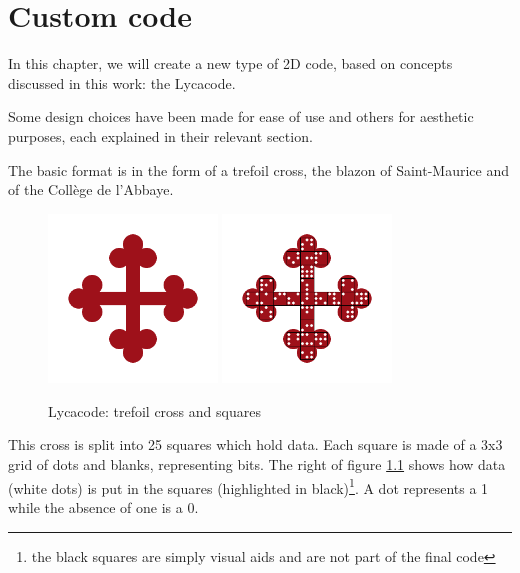 \chapter{Custom code}
\label{chap:custom_code}

In this chapter, we will create a new type of 2D code, based on concepts discussed in this work: the Lycacode.

Some design choices have been made for ease of use and others for aesthetic purposes, each explained in their relevant section.

The basic format is in the form of a trefoil cross, the blazon of Saint-Maurice and of the Collège de l'Abbaye.

\begin{figure}[H]
  \centering
  \includegraphics[width=0.4\textwidth]{images/lycacode_cross}
  \includegraphics[width=0.4\textwidth]{images/lycacode_squares}
  \caption{Lycacode: trefoil cross and squares}
  \label{fig:lycacode_cross}
\end{figure}


This cross is split into 25 squares which hold data. Each square is made of a 3x3 grid of dots and blanks, representing bits. The right of figure \ref{fig:lycacode_cross} shows how data (white dots) is put in the squares (highlighted in black)\footnote{the black squares are simply visual aids and are not part of the final code}. A dot represents a 1 while the absence of one is a 0.


